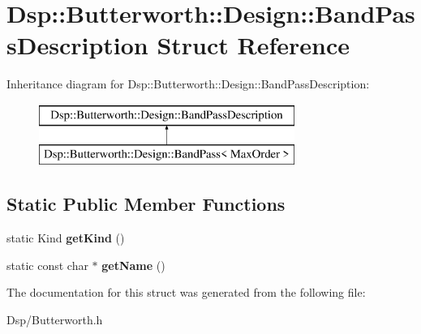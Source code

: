 \hypertarget{structDsp_1_1Butterworth_1_1Design_1_1BandPassDescription}{\section{Dsp\-:\-:Butterworth\-:\-:Design\-:\-:Band\-Pass\-Description Struct Reference}
\label{structDsp_1_1Butterworth_1_1Design_1_1BandPassDescription}
}
Inheritance diagram for Dsp\-:\-:Butterworth\-:\-:Design\-:\-:Band\-Pass\-Description\-:\begin{figure}[H]
\begin{center}
\leavevmode
\includegraphics[height=2.000000cm]{structDsp_1_1Butterworth_1_1Design_1_1BandPassDescription}
\end{center}
\end{figure}
\subsection*{Static Public Member Functions}
\begin{DoxyCompactItemize}
\item 
\hypertarget{structDsp_1_1Butterworth_1_1Design_1_1BandPassDescription_a053824a3b2ecb4e305ec3bb42ba908f9}{static Kind {\bfseries get\-Kind} ()}\label{structDsp_1_1Butterworth_1_1Design_1_1BandPassDescription_a053824a3b2ecb4e305ec3bb42ba908f9}

\item 
\hypertarget{structDsp_1_1Butterworth_1_1Design_1_1BandPassDescription_ad25efcf107a58957f761d872e272896c}{static const char $\ast$ {\bfseries get\-Name} ()}\label{structDsp_1_1Butterworth_1_1Design_1_1BandPassDescription_ad25efcf107a58957f761d872e272896c}

\end{DoxyCompactItemize}


The documentation for this struct was generated from the following file\-:\begin{DoxyCompactItemize}
\item 
Dsp/Butterworth.\-h\end{DoxyCompactItemize}
